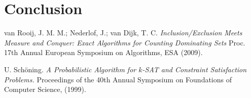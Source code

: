 \documentclass{article}
\begin{document}
\section{Conclusion}

\begin{thebibliography}{9}
	van Rooij, J. M. M.; Nederlof, J.; van Dijk, T. C. \textit{Inclusion/Exclusion Meets Measure and Conquer: Exact Algorithms for Counting Dominating Sets}
	Proc. 17th Annual European Symposium on Algorithms, ESA (2009).
	
	
	U. Sch\"{o}ning.
	\textit{A Probabilistic Algorithm for $k$-SAT and Constraint Satisfaction Problems.} Proceedings of the 40th Annual Symposium on Foundations of Computer Science, (1999).
\end{thebibliography}
\end{document}
